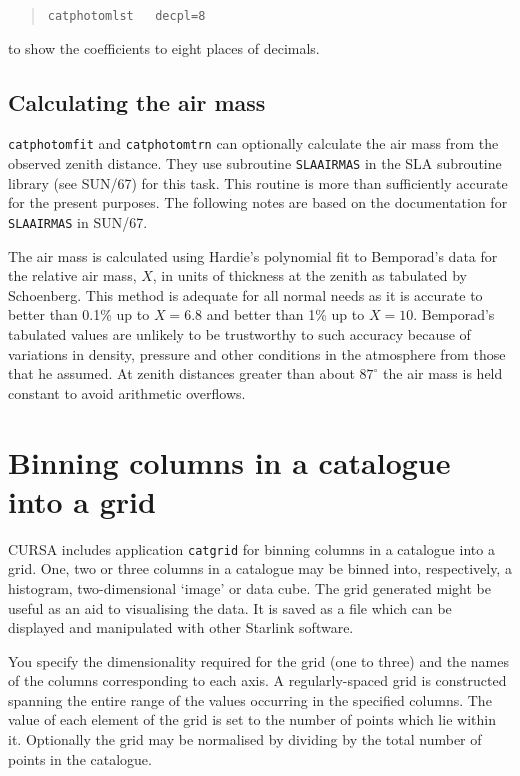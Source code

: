 \documentclass[twoside,11pt]{article}
\newcommand{\xref}[3]{#1}
\newcommand{\xlabel}[1]{}
\renewcommand{\_}{\texttt{\symbol{95}}}
\begin{document}
\begin{verse}
{\tt catphotomlst ~ decpl=8}
\end{verse}

to show the coefficients to eight places of decimals.

\subsection{\label{AIRMASS}Calculating the air mass}

{\tt catphotomfit} and {\tt catphotomtrn} can optionally calculate
the air mass from the observed zenith distance.  They use subroutine
{\tt SLA\_AIRMAS} in the SLA subroutine library (see
\xref{SUN/67}{sun67}{}\cite{SUN67}) for this task.  This routine is
more than sufficiently accurate for the present purposes.  The
following notes are based on the documentation for {\tt SLA\_AIRMAS}
in SUN/67.

The air mass is calculated using Hardie's\cite{HARDIE62} polynomial fit
to Bemporad's data for the relative air mass, $X$, in units of thickness
at the zenith as tabulated by Schoenberg\cite{SCHOEN29}.  This method
is adequate for all normal needs as it is accurate to better than 0.1\%
up to $X = 6.8$ and better than 1\% up to $X = 10$.  Bemporad's tabulated
values are unlikely to be trustworthy to such accuracy because of
variations in density, pressure and other conditions in the atmosphere
from those that he assumed.  At zenith distances greater than about 
$87^{\circ}$ the air mass is held constant to avoid arithmetic overflows.


\section{\xlabel{GRIDS}\label{GRIDS}Binning columns in a catalogue into a
grid}

CURSA includes application {\tt catgrid} for binning columns in a
catalogue into a grid.  One, two or three columns in a catalogue may
be binned into, respectively, a histogram, two-dimensional `image' or
data cube.  The grid generated might be useful as an aid to visualising
the data.  It is saved as a file which can be displayed and manipulated
with other Starlink software.

You specify the dimensionality required for the grid (one to three)
and the names of the columns corresponding to each axis.  A
regularly-spaced grid is constructed spanning the entire range of the
values occurring in the specified columns.  The value of each element
of the grid is set to the number of points which lie within it.
Optionally the grid may be normalised by dividing by the total number of
points in the catalogue.
\end{document}
